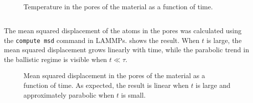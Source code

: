 \documentclass[11pt,british,a4paper]{report}
\begin{document}
\begin{figure}[H]
    \centering
    \caption{Temperature in the pores of the material as a function of time.}%
    \label{fig:temppores}
\end{figure}

\subsection{}
The mean squared displacement of the atoms in the pores was calculated using the \lstinline{compute msd} command in LAMMPs.  shows the result. When \(t\) is large, the mean squared displacement grows linearly with time, while the parabolic trend in the ballistic regime is visible when \(t\ll \tau\).
\begin{figure}[H]
    \centering
    \caption{Mean squared displacement in the pores of the material as a function of time. As expected, the result is linear when \(t\) is large and approximately parabolic when \(t\) is small.}%
    \label{fig:msdpores}
\end{figure}
\end{document}
